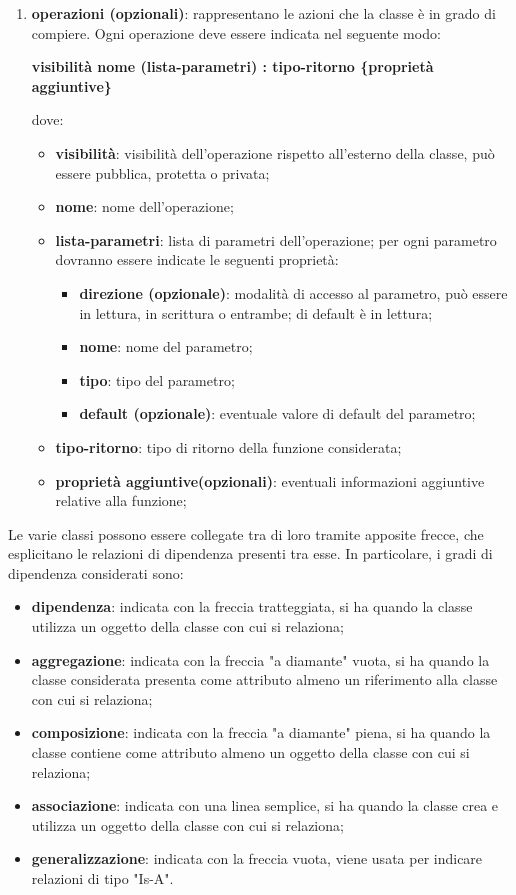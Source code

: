 \begin{enumerate}
    		\item{\textbf{operazioni (opzionali)}}: rappresentano le azioni che la classe è in grado di compiere. Ogni operazione deve essere indicata nel seguente modo: 
    			\begin{center}
    				\textbf{visibilità nome (lista-parametri) : tipo-ritorno \{proprietà aggiuntive\}}
    			\end{center}
    		dove: 
    			\begin{itemize}
    				\item{\textbf{visibilità}}: visibilità dell'operazione rispetto all'esterno della classe, può essere pubblica, protetta o privata; 
    				\item{\textbf{nome}}: nome dell'operazione; 
    				\item{\textbf{lista-parametri}}: lista di parametri dell'operazione; per ogni parametro dovranno essere indicate le seguenti proprietà: 
     				\begin{itemize}
     					\item{\textbf{direzione (opzionale)}}: modalità di accesso al parametro, può essere in lettura, in scrittura o entrambe; di default è in lettura;  
     					\item{\textbf{nome}}: nome del parametro; 
     					\item{\textbf{tipo}}: tipo del parametro; 
     					\item{\textbf{default (opzionale)}}: eventuale valore di default del parametro; 	
     				\end{itemize} 
    				\item{\textbf{tipo-ritorno}}: tipo di ritorno della funzione considerata;       					
				\item{\textbf{proprietà aggiuntive(opzionali)}}: eventuali informazioni aggiuntive relative alla funzione; 
    			\end{itemize}
    	\end{enumerate}
    	Le varie classi possono essere collegate tra di loro tramite apposite frecce, che esplicitano le relazioni di dipendenza presenti tra esse. In particolare, i gradi di dipendenza considerati sono: 
    	\begin{itemize}
    		\item{\textbf{dipendenza}}: indicata con la freccia tratteggiata, si ha quando la classe utilizza un oggetto della classe con cui si relaziona;
    		\item{\textbf{aggregazione}}: indicata con la freccia "a diamante" vuota, si ha quando la classe considerata presenta come attributo almeno un riferimento alla classe con cui si relaziona;
    		\item{\textbf{composizione}}: indicata con la freccia "a diamante" piena, si ha quando la classe contiene come attributo almeno un oggetto della classe con cui si relaziona;
    		\item{\textbf{associazione}}: indicata con una linea semplice, si ha quando la classe crea e utilizza un oggetto della classe con cui si relaziona;
    		\item{\textbf{generalizzazione}}: indicata con la freccia vuota, viene usata per indicare relazioni di tipo "Is-A". 
    	\end{itemize}
    	      	
